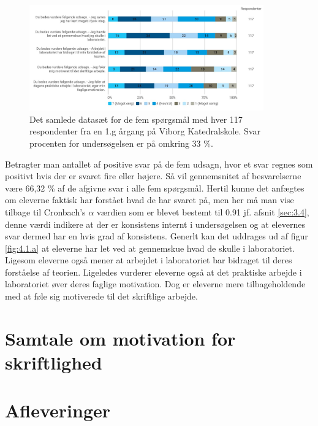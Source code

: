 \begin{figure}[h!]
	\centering
	\includegraphics[width=0.9\textwidth]{Figs/Sammenlign}
	\caption{Det samlede datasæt for de fem spørgsmål med hver 117 respondenter fra en 1.g årgang på Viborg Katedralskole. Svar procenten for undersøgelsen er på omkring 33 \%. }
	\label{fig:4.1.a}
\end{figure}
Betragter man antallet af positive svar på de fem udsagn, hvor et svar regnes som positivt hvis der er svaret fire eller højere. Så vil gennemsnitet af besvarelserne være 66,32 \% af de afgivne svar i alle fem spørgsmål.  Hertil kunne det anfægtes om eleverne faktisk har forstået hvad de har svaret på, men her må man vise tilbage til Cronbach's $\alpha$ værdien som er blevet bestemt til 0.91 jf. afsnit \vref{sec:3.4}, denne værdi indikere at der er konsistens internt i undersøgelsen og at elevernes svar dermed har en hvis grad af konsistens. Generlt kan det uddrages ud af figur \vref{fig:4.1.a} at eleverne har let ved at gennemskue hvad de skulle i laboratoriet. Ligesom eleverne også mener at arbejdet i laboratoriet bar bidraget til deres forståelse af teorien. Ligeledes vurderer eleverne også at det praktiske arbejde i laboratoriet øver deres faglige motivation. Dog er eleverne mere tilbageholdende med at føle sig motiverede til det skriftlige arbejde. 


\section{Samtale om motivation for skriftlighed}
\label{sec:4.2}


\section{Afleveringer}
\label{sec:4.4}

